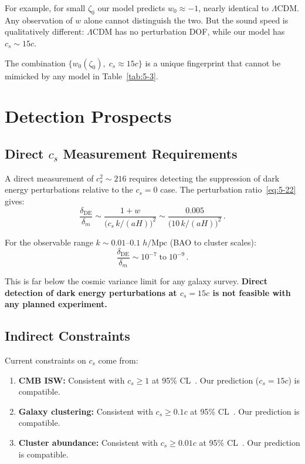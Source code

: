 For example, for small $\zeta_0$ our model predicts $w_0 \approx -1$, nearly identical to $\Lambda$CDM. Any observation of $w$ alone cannot distinguish the two. But the sound speed is qualitatively different: $\Lambda$CDM has no perturbation DOF, while our model has $c_s \sim 15c$.

The combination $\{w_0(\zeta_0),\; c_s \approx 15c\}$ is a unique fingerprint that cannot be mimicked by any model in Table~\ref{tab:5-3}.

\section{Detection Prospects}
\label{sec:5-detection}

\subsection{Direct \texorpdfstring{$c_s$}{cs} Measurement Requirements}
\label{sec:5-direct}

A direct measurement of $c_s^2 \sim 216$ requires detecting the suppression of dark energy perturbations relative to the $c_s = 0$ case. The perturbation ratio~\eqref{eq:5-22} gives:
\begin{equation}
  \frac{\delta_\mathrm{DE}}{\delta_m}
    \sim \frac{1+w}{\bigl(c_s\,k/(aH)\bigr)^2}
    \sim \frac{0.005}{\bigl(10\,k/(aH)\bigr)^2}\,.
  \label{eq:5-26}
\end{equation}

For the observable range $k \sim 0.01$--$0.1\;h/\mathrm{Mpc}$ (BAO to cluster scales):
\begin{equation}
  \frac{\delta_\mathrm{DE}}{\delta_m} \sim 10^{-7}\;\text{to}\;10^{-9}\,.
  \label{eq:5-27}
\end{equation}

This is far below the cosmic variance limit for any galaxy survey. \textbf{Direct detection of dark energy perturbations at $c_s = 15c$ is not feasible with any planned experiment.}

\subsection{Indirect Constraints}
\label{sec:5-indirect}

Current constraints on $c_s$ come from:

\begin{enumerate}
\item \textbf{CMB ISW:} Consistent with $c_s \geq 1$ at 95\% CL~\cite{ch5:Hanson2013}. Our prediction ($c_s = 15c$) is compatible.
\item \textbf{Galaxy clustering:} Consistent with $c_s \geq 0.1c$ at 95\% CL~\cite{ch5:Alam2017}. Our prediction is compatible.
\item \textbf{Cluster abundance:} Consistent with $c_s \geq 0.01c$ at 95\% CL~\cite{ch5:Planck2018}. Our prediction is compatible.
\end{enumerate}

